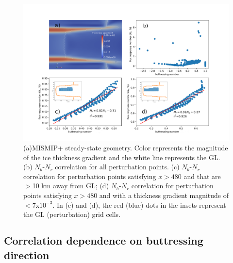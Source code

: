 \documentclass[review,oneside]{igs}
\begin{document}
\begin{figure}
\centering
\includegraphics[width=1\linewidth]{figs/fig2.pdf}
    \caption{(a)MISMIP+ steady-state geometry. Color represents the magnitude of the ice thickness gradient and the white line represents the GL. (b) $N_b$-$N_r$ correlation for all perturbation points. (c) $N_b$-$N_r$ correlation for perturbation points satisfying $x>480$ and that are $>$10 km away from GL; (d) $N_b$-$N_r$ correlation for perturbation points satisfying $x>480$ and with a thickness gradient magnitude of $<7$x$10^{-3}$. In (c) and (d), the red (blue) dots in the insets represent the GL (perturbation) grid cells.}
\label{fig2}
\end{figure}

\subsection{Correlation dependence on buttressing direction}
\end{document}

